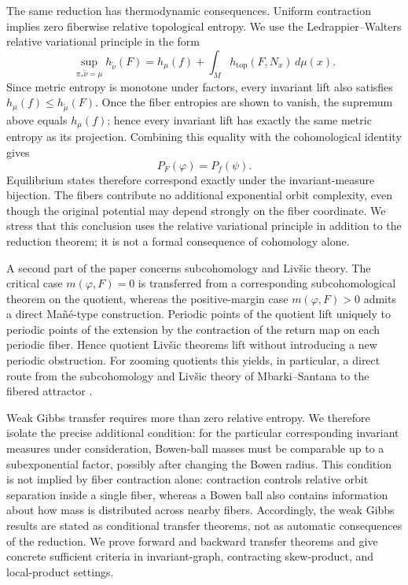 \documentclass[11pt,a4paper]{article}
\begin{document}
The same reduction has thermodynamic consequences. Uniform contraction
implies zero fiberwise relative topological entropy. We use the
Ledrappier--Walters relative variational principle in the form
\[
\sup_{\pi_*\widetilde\nu=\mu} h_{\widetilde\nu}(F)
=
h_\mu(f)+\int_M h_{\mathrm{top}}(F,N_x)\,d\mu(x).
\]
Since metric entropy is monotone under factors, every invariant lift also
satisfies $h_\mu(f)\le h_{\widetilde\mu}(F)$. Once the fiber entropies are
shown to vanish, the supremum above equals $h_\mu(f)$; hence every invariant
lift has exactly the same metric entropy as its projection. Combining this equality with the
cohomological identity gives
\[
P_F(\varphi)=P_f(\psi).
\]
Equilibrium states therefore correspond exactly under the invariant-measure
bijection. The fibers contribute no additional exponential orbit complexity,
even though the original potential may depend strongly on the fiber
coordinate. We stress that this conclusion uses the relative variational
principle in addition to the reduction theorem; it is not a formal
consequence of cohomology alone.

A second part of the paper concerns subcohomology and Liv\v{s}ic theory.
The critical case $m(\varphi,F)=0$ is transferred from a corresponding
subcohomological theorem on the quotient, whereas the positive-margin case
$m(\varphi,F)>0$ admits a direct Ma\~n\'e-type construction. Periodic points
of the quotient lift uniquely to periodic points of the extension by the
contraction of the return map on each periodic fiber. Hence quotient
Liv\v{s}ic theorems lift without introducing a new periodic obstruction.
For zooming quotients this yields, in particular, a direct route from the
subcohomology and Liv\v{s}ic theory of Mbarki--Santana to the fibered
attractor \cite{MbarkiSantana}.

Weak Gibbs transfer requires more than zero relative entropy. We therefore
isolate the precise additional condition: for the particular corresponding
invariant measures under consideration, Bowen-ball masses must be comparable
up to a subexponential factor, possibly after changing the Bowen radius.
This condition is not implied by fiber contraction alone: contraction controls
relative orbit separation inside a single fiber, whereas a Bowen ball also
contains information about how mass is distributed across nearby fibers.
Accordingly, the weak Gibbs results are stated as conditional transfer
theorems, not as automatic consequences of the reduction. We prove forward
and backward transfer theorems and give concrete sufficient criteria in
invariant-graph, contracting skew-product, and local-product settings.
\end{document}
